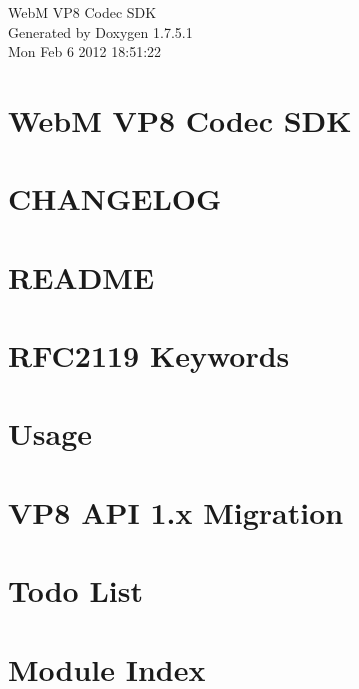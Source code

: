 \documentclass[letterpaper]{article}
\begin{document}
\hypersetup{pageanchor=false,citecolor=blue}
\begin{titlepage}
\vspace*{7cm}
\begin{center}
{\Large \-Web\-M \-V\-P8 \-Codec \-S\-D\-K }\\
\vspace*{1cm}
{\large \-Generated by Doxygen 1.7.5.1}\\
\vspace*{0.5cm}
{\small Mon Feb 6 2012 18:51:22}\\
\end{center}
\end{titlepage}
\tableofcontents
{}
\hypersetup{pageanchor=true,citecolor=blue}
\section{\-Web\-M \-V\-P8 \-Codec \-S\-D\-K}
\label{index}\hypertarget{index}{}
\section{\-C\-H\-A\-N\-G\-E\-L\-O\-G}
\label{changelog}
\hypertarget{changelog}{}

\section{\-R\-E\-A\-D\-M\-E}
\label{readme}
\hypertarget{readme}{}

\section{\-R\-F\-C2119 \-Keywords}
\label{rfc2119}
\hypertarget{rfc2119}{}

\section{\-Usage}
\label{usage}
\hypertarget{usage}{}

\section{\-V\-P8 \-A\-P\-I 1.x \-Migration}
\label{vp8_api1_migration}
\hypertarget{vp8_api1_migration}{}

\section{\-Todo \-List}
\label{todo}
\hypertarget{todo}{}

\section{\-Module \-Index}

\end{document}
